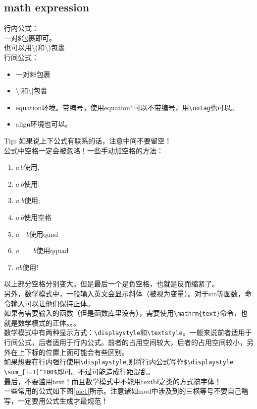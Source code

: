 \documentclass{article}
\begin{document}
\subsection{math expression}
\noindent
行内公式：\\
一对\$包裹即可。\\
也可以用\textbackslash(和\textbackslash)包裹
\\
行间公式：
\begin{itemize}
    \item 一对\$\$包裹
    \item \textbackslash[和\textbackslash]包裹
    \item equation环境。带编号。使用equation*可以不带编号，用\verb|\notag|也可以。
    \item align环境也可以。
\end{itemize}
Tip: 如果说上下公式有联系的话，注意中间不要留空！\\
公式中空格一定会被忽略！一些手动加空格的方法：
\begin{enumerate}
    \item $a\,b\text{使用,}$
    \item $a\:b\text{使用:}$
    \item $a\;b\text{使用;}$
    \item $a\ b\text{使用空格}$
    \item $a\quad b\text{使用quad}$
    \item $a\qquad b\text{使用qquad}$
    \item $a\!b\text{使用!}$
\end{enumerate}
以上部分空格分别变大。但是最后一个是负空格，也就是反而缩紧了。\\
另外，数学模式中，一般输入英文会显示斜体（被视为变量）。对于sin等函数，命令输入可以让他们保持正体。\\
如果有需要输入的函数（但是函数库里没有），需要使用\verb|\mathrm{text}|命令，也就是数学模式的正体。。。\\
数学模式中有两种显示方式：\verb|\displaystyle|和\verb|\textstyle|。一般来说前者适用于行间公式，后者适用于行内公式。前者的占用空间较大，后者的占用空间较小，另外在上下标的位置上面可能会有些区别。\\
如果想要在行内强行使用\verb|\displaystyle|,则将行内公式写作\verb|$\displaystyle \sum_{i=1}^100$|即可。不过可能造成行距混乱。\\
最后，不要滥用text！而且数学模式中不能用textbf之类的方式搞字体！\\
一些常用的公式如下图\ref{pic1}所示。注意诸如mod中涉及到的三横等号不要自己瞎写，一定要用公式生成才最规范！\\
\end{document}
